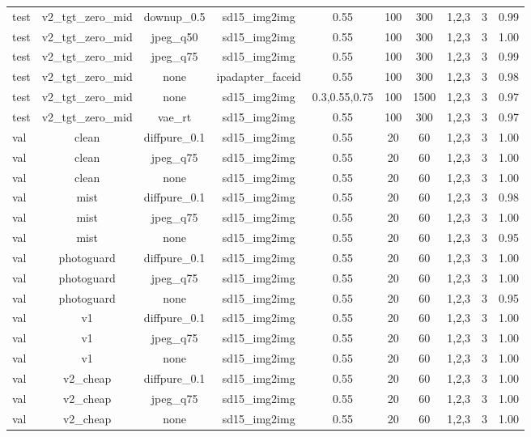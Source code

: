 \begin{table}[t]
{\begin{tabular}{lccccccccc}
test & v2\_tgt\_zero\_mid & downup\_0.5 & sd15\_img2img & 0.55 & 100 & 300 & 1,2,3 & 3 & 0.99 \\
test & v2\_tgt\_zero\_mid & jpeg\_q50 & sd15\_img2img & 0.55 & 100 & 300 & 1,2,3 & 3 & 1.00 \\
test & v2\_tgt\_zero\_mid & jpeg\_q75 & sd15\_img2img & 0.55 & 100 & 300 & 1,2,3 & 3 & 0.99 \\
test & v2\_tgt\_zero\_mid & none & ipadapter\_faceid & 0.55 & 100 & 300 & 1,2,3 & 3 & 0.98 \\
test & v2\_tgt\_zero\_mid & none & sd15\_img2img & 0.3,0.55,0.75 & 100 & 1500 & 1,2,3 & 3 & 0.97 \\
test & v2\_tgt\_zero\_mid & vae\_rt & sd15\_img2img & 0.55 & 100 & 300 & 1,2,3 & 3 & 0.97 \\
val & clean & diffpure\_0.1 & sd15\_img2img & 0.55 & 20 & 60 & 1,2,3 & 3 & 1.00 \\
val & clean & jpeg\_q75 & sd15\_img2img & 0.55 & 20 & 60 & 1,2,3 & 3 & 1.00 \\
val & clean & none & sd15\_img2img & 0.55 & 20 & 60 & 1,2,3 & 3 & 1.00 \\
val & mist & diffpure\_0.1 & sd15\_img2img & 0.55 & 20 & 60 & 1,2,3 & 3 & 0.98 \\
val & mist & jpeg\_q75 & sd15\_img2img & 0.55 & 20 & 60 & 1,2,3 & 3 & 1.00 \\
val & mist & none & sd15\_img2img & 0.55 & 20 & 60 & 1,2,3 & 3 & 0.95 \\
val & photoguard & diffpure\_0.1 & sd15\_img2img & 0.55 & 20 & 60 & 1,2,3 & 3 & 1.00 \\
val & photoguard & jpeg\_q75 & sd15\_img2img & 0.55 & 20 & 60 & 1,2,3 & 3 & 1.00 \\
val & photoguard & none & sd15\_img2img & 0.55 & 20 & 60 & 1,2,3 & 3 & 0.95 \\
val & v1 & diffpure\_0.1 & sd15\_img2img & 0.55 & 20 & 60 & 1,2,3 & 3 & 1.00 \\
val & v1 & jpeg\_q75 & sd15\_img2img & 0.55 & 20 & 60 & 1,2,3 & 3 & 1.00 \\
val & v1 & none & sd15\_img2img & 0.55 & 20 & 60 & 1,2,3 & 3 & 1.00 \\
val & v2\_cheap & diffpure\_0.1 & sd15\_img2img & 0.55 & 20 & 60 & 1,2,3 & 3 & 1.00 \\
val & v2\_cheap & jpeg\_q75 & sd15\_img2img & 0.55 & 20 & 60 & 1,2,3 & 3 & 1.00 \\
val & v2\_cheap & none & sd15\_img2img & 0.55 & 20 & 60 & 1,2,3 & 3 & 1.00 \\

\end{tabular}}
\end{table}
